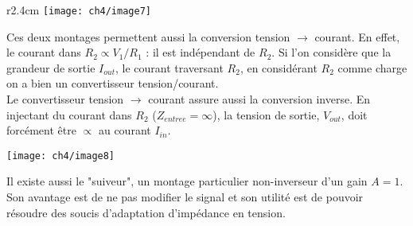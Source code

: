 	\begin{wrapfigure}[9]{r}{2.4cm}
	\vspace{-1.2cm}
	\texttt{[image: ch4/image7]}
	\end{wrapfigure}
	Ces deux montages permettent aussi la conversion tension $\rightarrow$ courant. 
	En effet, le courant dans $R_2 \propto V_1/R_1$ : il est 
	indépendant de $R_2$. Si l'on considère que la grandeur de sortie 
	$I_{out}$, le courant traversant $R_2$, en considérant $R_2$ comme 
	charge on a bien un convertisseur tension/courant.\\
	
	Le convertisseur tension $\rightarrow$ courant assure aussi la conversion inverse. 
	En injectant du courant dans $R_2$ ($Z_{entree}=\infty$), la tension 
	de sortie, $V_{out}$, doit forcément être $\propto$ au courant $I_{in}$.
	
	\begin{center}
		\texttt{[image: ch4/image8]}
	\end{center}
	Il existe aussi le "suiveur", un montage particulier non-inverseur 
	d'un gain $A=1$. Son avantage est de ne pas modifier le signal et son 
	utilité est de pouvoir résoudre des soucis d'adaptation d'impédance en 
	tension.
	
	
